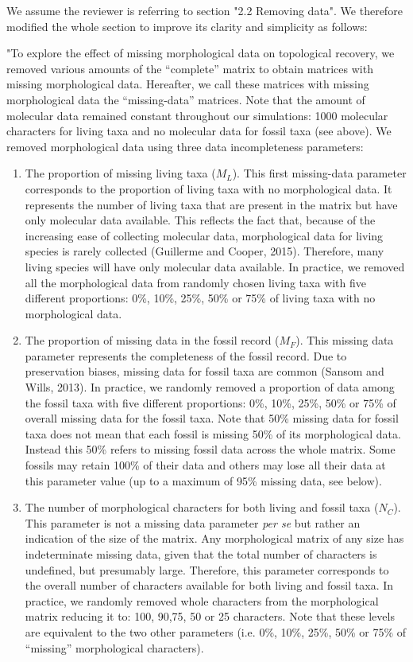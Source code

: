 \documentclass[12pt,letterpaper]{article}
\begin{document}
\begin{enumerate}
We assume the reviewer is referring to section "2.2 Removing data". We therefore modified the whole section to improve its clarity and simplicity as follows:

"To explore the effect of missing morphological data on topological recovery, we removed various amounts of the ``complete'' matrix to obtain matrices with missing morphological data.
Hereafter, we call these matrices with missing morphological data the ``missing-data'' matrices.
Note that the amount of molecular data remained constant throughout our simulations: 1000 molecular characters for living taxa and no molecular data for fossil taxa (see above).
We removed morphological data using three data incompleteness parameters:
\begin{enumerate}
\item{The proportion of missing living taxa ($M_L$).} This first missing-data parameter corresponds to the proportion of living taxa with no morphological data. It represents the number of living taxa that are present in the matrix but have only molecular data available. This reflects the fact that, because of the increasing ease of collecting molecular data, morphological data for living species is rarely collected (Guillerme and Cooper, 2015). Therefore, many living species will have only molecular data available. In practice, we removed all the morphological data from randomly chosen living taxa with five different proportions: 0\%, 10\%, 25\%, 50\% or 75\% of living taxa with no morphological data.
\item{The proportion of missing data in the fossil record ($M_F$).} This missing data parameter represents the completeness of the fossil record. Due to preservation biases, missing data for fossil taxa are common (Sansom and Wills, 2013). In practice, we randomly removed a proportion of data among the fossil taxa with five different proportions: 0\%, 10\%, 25\%, 50\% or 75\% of overall missing data for the fossil taxa.
Note that 50\% missing data for fossil taxa does not mean that each fossil is missing 50\% of its morphological data.
Instead this 50\% refers to missing fossil data across the whole matrix.
Some fossils may retain 100\% of their data and others may lose all their data at this parameter value (up to a maximum of 95\% missing data, see below). %
\item{The number of morphological characters for both living and fossil taxa ($N_C$).} This parameter is not a missing data parameter \textit{per se} but rather an indication of the size of the matrix. Any morphological matrix of any size has indeterminate missing data, given that the total number of characters is undefined, but presumably large. Therefore, this parameter corresponds to the overall number of characters available for both living and fossil taxa. In practice, we randomly removed whole characters from the morphological matrix reducing it to: 100, 90,75, 50 or 25 characters.
Note that these levels are equivalent to the two other parameters (i.e. 0\%, 10\%, 25\%, 50\% or 75\% of ``missing'' morphological characters).
\end{enumerate}


\end{enumerate}
\end{document}
